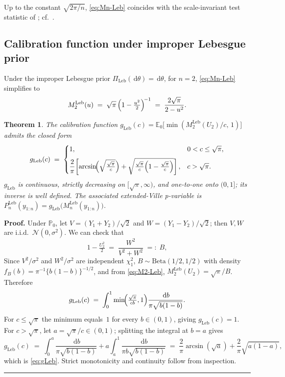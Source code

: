 \documentclass{article}%
\newtheorem{theorem}{Theorem}[section]
\newenvironment{proof}[1][Proof]{\noindent\textbf{#1.} }{\ \rule{0.5em}{0.5em}}
\newcommand{\E}{\mathbb{E}}
\newcommand{\Prob}{\mathbb{P}}
\newcommand{\dd}{\,\mathrm{d}}
\newcommand{\Leb}{\mathrm{Leb}}
\newcommand{\1}{\mathbf{1}}
\begin{document}
Up to the constant \(\sqrt{2\pi/n}\), \eqref{eq:Mn-Leb} coincides with the scale-invariant test statistic of \cite[Theorem 2]{Lai1976}; cf.\
\cite[Theorem 4.1]{Wang2025}.

\subsection{Calibration function under improper Lebesgue prior}\label{sec:Leb_cal}

Under the improper Lebesgue prior \(\Pi_{\Leb}(\dd\theta)=\dd\theta\), for \(n=2\), \eqref{eq:Mn-Leb} simplifies to
\begin{equation}\label{eq:M2-Leb}
   M_2^{\Leb}(u)\;=\;\sqrt{\pi}\,\Bigl(1-\tfrac{u^2}{2}\Bigr)^{\!-1}
   \;=\;\frac{2\sqrt\pi}{2-u^2}.
\end{equation}

\begin{theorem}\label{thm:gLeb}
The calibration function
\(g_{\Leb}(c)=\E_0\bigl[\min(M_2^{\Leb}(U_2)/c,\,1)\bigr]\)
admits the closed form
\begin{equation}\label{eq:gLeb}
  g_{\Leb}(c)
  \;=\;
  \begin{cases}
   1, & 0<c\leq\sqrt\pi,\\[6pt]
   \dfrac{2}{\pi}\!\left[
     \arcsin\!\Bigl(\sqrt{\tfrac{\sqrt\pi}{c}}\Bigr)
     +\sqrt{\tfrac{\sqrt\pi}{c}\Bigl(1-\tfrac{\sqrt\pi}{c}\Bigr)}\right],
   & c>\sqrt\pi.
  \end{cases}
\end{equation}
\(g_{\Leb}\) is continuous, strictly decreasing on \([\sqrt\pi,\infty)\),
and one-to-one onto \((0,1]\); its inverse is well defined.
The associated extended-Ville p-variable is
\(P_n^{\Leb}(y_{1:n})=g_{\Leb}\bigl(M_n^{\Leb}(y_{1:n})\bigr)\).
\end{theorem}

\begin{proof}
    Under \(\Prob_0\), let \(V=(Y_1+Y_2)/\sqrt 2\) and
\(W=(Y_1-Y_2)/\sqrt 2\); then \(V,W\) are i.i.d.\
\(\mathcal N(0,\sigma^2)\). We can check that
\[
   1-\tfrac{U_2^2}{2}\;=\;\frac{W^2}{V^2+W^2}\;=:\;B,
\]
Since $V^2/\sigma^2$ and $W^2/\sigma^2$ are independent $\chi_1^2$, \(B\sim\mathrm{Beta}(1/2,1/2)\) with density
\(f_B(b)=\pi^{-1}\{b(1-b)\}^{-1/2}\), and from \eqref{eq:M2-Leb},
\(M_2^{\Leb}(U_2)=\sqrt\pi/B\). Therefore
\[
  g_{\Leb}(c)
  \;=\;\int_0^1\min\!\Bigl(\tfrac{\sqrt\pi}{cb},1\Bigr)
       \frac{\dd b}{\pi\sqrt{b(1-b)}}.
\]
For \(c\leq\sqrt\pi\) the minimum equals~\(1\) for every
\(b\in(0,1)\), giving \(g_{\Leb}(c)=1\). For \(c>\sqrt\pi\), let
\(a=\sqrt\pi/c\in(0,1)\); splitting the integral at \(b=a\) gives
\[
  g_{\Leb}(c)\;=\;
  \int_0^a\frac{\dd b}{\pi\sqrt{b(1-b)}}
  +a\int_a^1\frac{\dd b}{\pi b\sqrt{b(1-b)}}
  \;=\;\frac{2}{\pi}\arcsin(\sqrt a)+\frac{2}{\pi}\sqrt{a(1-a)},
\]
which is \eqref{eq:gLeb}. Strict monotonicity and continuity follow
from inspection.
\end{proof}
\end{document}
